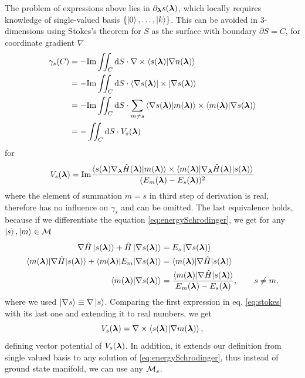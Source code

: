 The problem of expressions above lies in $\partial_{\bm\lambda} s({\bm\lambda})$, which locally requires knowledge of single-valued basis $\{\ket{0},\dots, \ket{k}\}$. This can be avoided in 3-dimensions using Stokes's theorem for $S$ as the surface with boundary $\partial S=C$, for coordinate gradient $\nabla$
\begin{equation}
    \begin{split}
        \gamma_s(C) &= -\textrm{Im} \iint_C \mathrm{d} S \cdot \nabla \times \braket{s({\bm\lambda})|\nabla n({\bm\lambda})}\\
         &= -\textrm{Im} \iint_C \mathrm{d} S \cdot \braket{\nabla s({\bm\lambda})|\times|\nabla s({\bm\lambda})}\\
        &= -\textrm{Im} \iint_C \mathrm{d} S \cdot \sum_{m\neq s} \braket{\nabla s({\bm\lambda})|m({\bm\lambda})}\times \braket{m({\bm\lambda})|\nabla s({\bm\lambda})}\\
        &= -\iint_C \mathrm{d} S \cdot V_s({\bm\lambda})
            \label{eq:stokes}
    \end{split}
\end{equation}
for 
\begin{equation}
    V_s({\bm\lambda}) = \textrm{Im} \frac{
            \braket{s({\bm\lambda})\nabla_{\bm\lambda} \hat{H}({\bm\lambda}) |m({\bm\lambda})}\times \braket{m({\bm\lambda})|\nabla_{\bm\lambda} \hat{H}({\bm\lambda})|s({\bm\lambda})}    
             }{
(E_m({\bm\lambda})-E_s({\bm\lambda}))^2
            }
\end{equation}
where the element of summation $m=s$ in third step of derivation is real, therefore has no influence on $\gamma_s$ and can be omitted. The last equivalence holds, because if we differentiate the \Schrodinger equation \ref{eq:energySchrodinger}, we get for any $\ket{s},\ket{m}\in \mathcal{M}$
\begin{equation}
    \begin{split}
        \nabla \hat{H}\ket{s({\bm\lambda})}+\hat{H} \ket{\nabla s({\bm\lambda})} &= E_s\ket{\nabla s({\bm\lambda})}\\
        \braket{m({\bm\lambda})|\nabla \hat{H}|s({\bm\lambda})}+\braket{m({\bm\lambda})|E_m|\nabla s({\bm\lambda})} &= \braket{m({\bm\lambda})|\nabla \hat{H}|s({\bm\lambda})}\\
        \braket{m({\bm\lambda})|\nabla s({\bm\lambda})}&=
        \frac{\braket{m({\bm\lambda})|\nabla \hat{H} |s({\bm\lambda})}}
        { E_m({\bm\lambda})-E_s({\bm\lambda})}, \qquad s\neq m,
    \end{split}
\end{equation}
where we used $\ket{\nabla s}\equiv\nabla \ket{ s}$.
Comparing the first expression in eq. \ref{eq:stokes} with its last one and extending it to real numbers, we get
\begin{equation}
    V_s({\bm\lambda})=\nabla\times\braket{s({\bm\lambda})|\nabla m({\bm\lambda})}, 
    \label{eq:vectorPotentialDef}  
\end{equation}
defining vector potential of $V_s({\bm\lambda})$. In addition, it extends our definition from single valued basis to any solution of \ref{eq:energySchrodinger}, thus instead of ground state manifold, we can use any $\mathcal{M}_s$.

